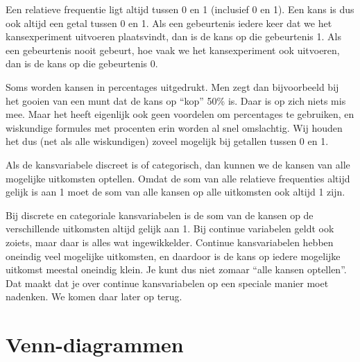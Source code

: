 \documentclass[
  a4paper,
]{scrbook}
\theoremstyle{definition}
\theoremstyle{definition}
\theoremstyle{remark}
\newcounter{quartocalloutwrnno}
\newcommand{\quartocalloutwrn}[1]{\refstepcounter{quartocalloutwrnno}\label{#1}}
\begin{document}
Een relatieve frequentie ligt altijd tussen 0 en 1 (inclusief 0 en 1).
Een kans is dus ook altijd een getal tussen 0 en 1. Als een gebeurtenis
iedere keer dat we het kansexperiment uitvoeren plaatsvindt, dan is de
kans op die gebeurtenis 1. Als een gebeurtenis nooit gebeurt, hoe vaak
we het kansexperiment ook uitvoeren, dan is de kans op die gebeurtenis
0.

Soms worden kansen in percentages uitgedrukt. Men zegt dan bijvoorbeeld
bij het gooien van een munt dat de kans op ``kop'' 50\% is. Daar is op
zich niets mis mee. Maar het heeft eigenlijk ook geen voordelen om
percentages te gebruiken, en wiskundige formules met procenten erin
worden al snel omslachtig. Wij houden het dus (net als alle wiskundigen)
zoveel mogelijk bij getallen tussen 0 en 1.

Als de kansvariabele discreet is of categorisch, dan kunnen we de kansen
van alle mogelijke uitkomsten optellen. Omdat de som van alle relatieve
frequenties altijd gelijk is aan 1 moet de som van alle kansen op alle
uitkomsten ook altijd 1 zijn.

\begin{tcolorbox}[enhanced jigsaw, arc=.35mm, bottomrule=.15mm, colframe=quarto-callout-warning-color-frame, colback=white, bottomtitle=1mm, colbacktitle=quarto-callout-warning-color!10!white, left=2mm, titlerule=0mm, coltitle=black, opacitybacktitle=0.6, breakable, toptitle=1mm, title=\textcolor{quarto-callout-warning-color}{\faExclamationTriangle}\hspace{0.5em}{Warning \ref*{wrn-continue-kansvariabelen}: De som van alle kansen bij continue kansvariabelen}, opacityback=0, toprule=.15mm, leftrule=.75mm, rightrule=.15mm]

\quartocalloutwrn{wrn-continue-kansvariabelen} 

Bij discrete en categoriale kansvariabelen is de som van de kansen op de
verschillende uitkomsten altijd gelijk aan 1. Bij continue variabelen
geldt ook zoiets, maar daar is alles wat ingewikkelder. Continue
kansvariabelen hebben oneindig veel mogelijke uitkomsten, en daardoor is
de kans op iedere mogelijke uitkomst meestal oneindig klein. Je kunt dus
niet zomaar ``alle kansen optellen''. Dat maakt dat je over continue
kansvariabelen op een speciale manier moet nadenken. We komen daar later
op terug.

\end{tcolorbox}

\section{Venn-diagrammen}\label{venn-diagrammen}
\end{document}
